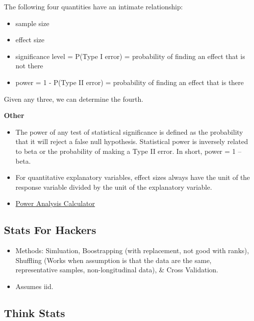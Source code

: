 \documentclass[]{book}
\theoremstyle{definition}
\theoremstyle{definition}
\theoremstyle{definition}
\theoremstyle{remark}
\begin{document}
The following four quantities have an intimate relationship:

\begin{itemize}
\item
  sample size
\item
  effect size
\item
  significance level = P(Type I error) = probability of finding an
  effect that is not there
\item
  power = 1 - P(Type II error) = probability of finding an effect that
  is there
\end{itemize}

Given any three, we can determine the fourth.

\textbf{Other}

\begin{itemize}
\item
  The power of any test of statistical significance is defined as the
  probability that it will reject a false null hypothesis. Statistical
  power is inversely related to beta or the probability of making a Type
  II error. In short, power = 1 -- beta.
\item
  For quantitative explanatory variables, effect sizes always have the
  unit of the response variable divided by the unit of the explanatory
  variable.
\item
  \href{http://www.evanmiller.org/ab-testing/sample-size.html}{Power
  Analysis Calculator}
\end{itemize}

\subsection{Stats For Hackers}\label{stats-for-hackers}

\begin{itemize}
\item
  Methods: Simluation, Boostrapping (with replacement, not good with
  ranks), Shuffling (Works when assumption is that the data are the
  same, representative samples, non-longitudinal data), \& Cross
  Validation.
\item
  Assumes iid.
\end{itemize}

\subsection{Think Stats}\label{think-stats}
\end{document}
